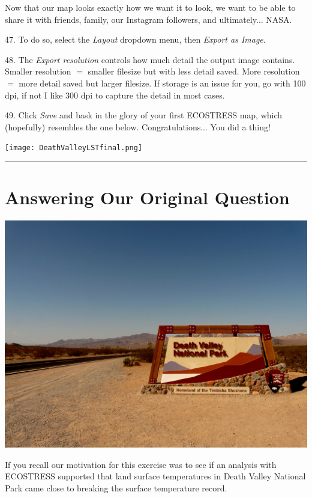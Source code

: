 \documentclass[oneside,a4paper,11pt,explicit]{book}
\begin{document}
Now that our map looks exactly how we want it to look, we want to be able to share it with friends, family, our Instagram followers, and ultimately... NASA. 

47. To do so, select the \textit{Layout} dropdown menu, then \textit{Export as Image}. 

48. The \textit{Export resolution} controls how much detail the output image contains. Smaller resolution $=$ smaller filesize but with less detail saved. More resolution $=$ more detail saved but larger filesize. If storage is an issue for you, go with 100 dpi, if not I like 300 dpi to capture the detail in most cases.

49. Click \textit{Save} and bask in the glory of your first ECOSTRESS map, which (hopefully) resembles the one below. Congratulations... You did a thing!


\centerline{\texttt{[image: DeathValleyLSTfinal.png]}}

\vspace{.25em}

\hrule

\section{Answering Our Original Question}

\centerline{\includegraphics[width=.75\textwidth]{DeathValleySign.jpg}}

If you recall our motivation for this exercise was to see if an analysis with ECOSTRESS supported that land surface temperatures in Death Valley National Park came close to breaking the surface temperature record. 
\end{document}
